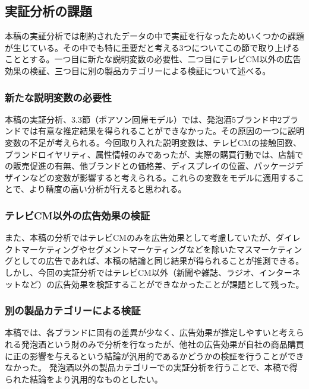 \documentclass[11pt]{jsarticle}
\begin{document}
\subsection{実証分析の課題}
\label{sec:issue}
本稿の実証分析では制約されたデータの中で実証を行なったためいくつかの課題が生じている。その中でも特に重要だと考える3つについてこの節で取り上げることとする。一つ目に新たな説明変数の必要性、二つ目にテレビCM以外の広告効果の検証、三つ目に別の製品カテゴリーによる検証について述べる。

\subsubsection{新たな説明変数の必要性}
\label{subsec:issue1}
本稿の実証分析、3.3節（ポアソン回帰モデル）では、発泡酒5ブランド中2ブランドでは有意な推定結果を得られることができなかった。その原因の一つに説明変数の不足が考えられる。今回取り入れた説明変数は、テレビCMの接触回数、ブランドロイヤリティ、属性情報のみであったが、実際の購買行動では、店舗での販売促進の有無、他ブランドとの価格差、ディスプレイの位置、パッケージデザインなどの変数が影響すると考えられる。これらの変数をモデルに適用することで、より精度の高い分析が行えると思われる。

\subsubsection{テレビCM以外の広告効果の検証}
 \label{subsec:issue2}
また、本稿の分析ではテレビCMのみを広告効果として考慮していたが、ダイレクトマーケティングやセグメントマーケティングなどを除いたマスマーケティングとしての広告であれば、本稿の結論と同じ結果が得られることが推測できる。
しかし、今回の実証分析ではテレビCM以外（新聞や雑誌、ラジオ、インターネットなど）の広告効果を検証することができなかったことが課題として残った。

\subsubsection{別の製品カテゴリーによる検証}
 \label{issue3}
本稿では、各ブランドに固有の差異が少なく、広告効果が推定しやすいと考えられる発泡酒という財のみで分析を行なったが、他社の広告効果が自社の商品購買に正の影響を与えるという結論が汎用的であるかどうかの検証を行うことができなかった。
発泡酒以外の製品カテゴリーでの実証分析を行うことで、本稿で得られた結論をより汎用的なものとしたい。
\end{document}
